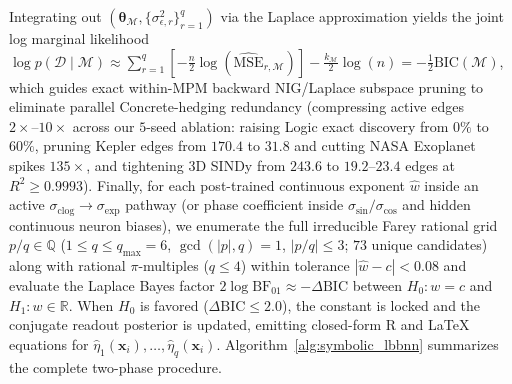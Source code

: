 \documentclass[11pt,a4paper]{article}
\begin{document}
Integrating out $(\bm{\theta}_{\mathcal{M}}, \{\sigma_{\epsilon,r}^2\}_{r=1}^q)$ via the Laplace approximation yields the joint log marginal likelihood $\log p(\mathcal{D} \mid \mathcal{M}) \approx \sum_{r=1}^q \left[-\frac{n}{2}\log(\widehat{\mathrm{MSE}}_{r,\mathcal{M}})\right] - \frac{k_{\mathcal{M}}}{2}\log(n) = -\frac{1}{2}\mathrm{BIC}(\mathcal{M})$, which guides exact within-MPM backward NIG/Laplace subspace pruning to eliminate parallel Concrete-hedging redundancy (compressing active edges $2\times\text{--}10\times$ across our $5$-seed ablation: raising Logic exact discovery from $0\%$ to $60\%$, pruning Kepler edges from $170.4$ to $31.8$ and cutting NASA Exoplanet spikes $135\times$, and tightening 3D SINDy from $243.6$ to $19.2\text{--}23.4$ edges at $R^2 \ge 0.9993$). Finally, for each post-trained continuous exponent $\hat{w}$ inside an active $\sigma_{\text{clog}} \to \sigma_{\exp}$ pathway (or phase coefficient inside $\sigma_{\sin}/\sigma_{\cos}$ and hidden continuous neuron biases), we enumerate the full irreducible Farey rational grid $p/q \in \mathbb{Q}$ ($1 \le q \le q_{\max} = 6$, $\gcd(|p|, q) = 1$, $|p/q| \le 3$; $73$ unique candidates) along with rational $\pi$-multiples ($q \le 4$) within tolerance $|\hat{w} - c| < 0.08$ and evaluate the Laplace Bayes factor $2\log \mathrm{BF}_{01} \approx -\Delta \mathrm{BIC}$ between $H_0: w = c$ and $H_1: w \in \mathbb{R}$. When $H_0$ is favored ($\Delta \mathrm{BIC} \le 2.0$), the constant is locked and the conjugate readout posterior is updated, emitting closed-form R and \LaTeX{} equations for $\hat{\eta}_1(\bm{x}_i), \dots, \hat{\eta}_q(\bm{x}_i)$. Algorithm~\ref{alg:symbolic_lbbnn} summarizes the complete two-phase procedure.
\end{document}
